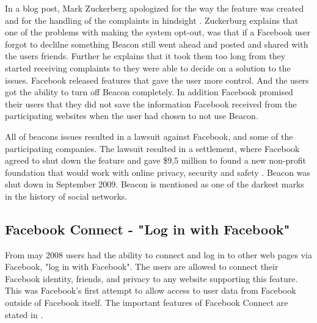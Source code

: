 In a blog post, Mark Zuckerberg apologized for the way the feature was created and for the handling of the complaints in hindsight \cite{Beacon}. Zuckerburg explains that one of the problems with making the system opt-out, was that if a Facebook user forgot to declilne something Beacon still went ahead and posted and shared with the users friends. Further he explains that it took them too long from they started receiving complaints to they were able to decide on a solution to the issues. Facebook released features that gave the user more control. And the users got the ability to turn off Beacon completely.  In addition Facebook promised their users that they did not save the information Facebook received from the participating websites when the user had chosen to not use Beacon. 

All of beacons issues resulted in a lawsuit against Facebook, and some of the participating companies. The lawsuit resulted in a settlement, where Facebook agreed to shut down the feature and gave \$9,5 million to found a new non-profit foundation that would work with online privacy, security and safety \cite{lawsuitB}. Beacon was shut down in September 2009. Beacon is mentioned as one of the darkest marks in the history of social networks.

\subsection{Facebook Connect - "Log in with Facebook"}
From may 2008 users had the ability to connect and log in to other web pages via Facebook, "log in with Facebook". The users are allowed to connect their Facebook identity, friends, and privacy to any website supporting this feature. This was Facebook's first attempt to allow access to user data from Facebook outside of Facebook itself. The important features of Facebook Connect are stated in .


